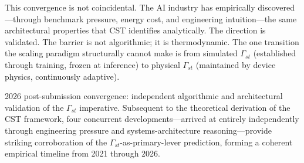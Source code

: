 \documentclass[a4paper,12pt]{article}
\begin{document}
This convergence is not coincidental. The AI industry has empirically discovered---through benchmark pressure, energy cost, and engineering intuition---the same architectural properties that CST identifies analytically. The direction is validated. The barrier is not algorithmic; it is thermodynamic. The one transition the scaling paradigm structurally cannot make is from simulated $\Gamma_{st}$ (established through training, frozen at inference) to physical $\Gamma_{st}$ (maintained by device physics, continuously adaptive).


2026 post-submission convergence: independent algorithmic and architectural validation of the $\Gamma_{st}$ imperative. Subsequent to the theoretical derivation of the CST framework, four concurrent developments---arrived at entirely independently through engineering pressure and systems-architecture reasoning---provide striking corroboration of the $\Gamma_{st}$-as-primary-lever prediction, forming a coherent empirical timeline from 2021 through 2026.
\end{document}

